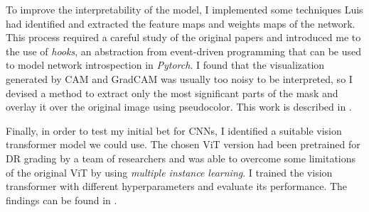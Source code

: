 To improve the interpretability of the model, I implemented some techniques Luis had identified and extracted the feature maps and weights maps of the network. This process required a careful study of the original papers and introduced me to the use of \textit{hooks}, an abstraction from event-driven programming that can be used to model network introspection in \textit{Pytorch}. I found that the visualization generated by CAM and GradCAM was usually too noisy to be interpreted, so I devised a method to extract only the most significant parts of the mask and overlay it over the original image using pseudocolor. This work is described in .

Finally, in order to test my initial bet for CNNs, I identified a suitable vision transformer model we could use. The chosen ViT version had been pretrained for DR grading by a team of researchers and was able to overcome some limitations of the original ViT by using \textit{multiple instance learning}. I trained the vision transformer with different hyperparameters and evaluate its performance. The findings can be found in .